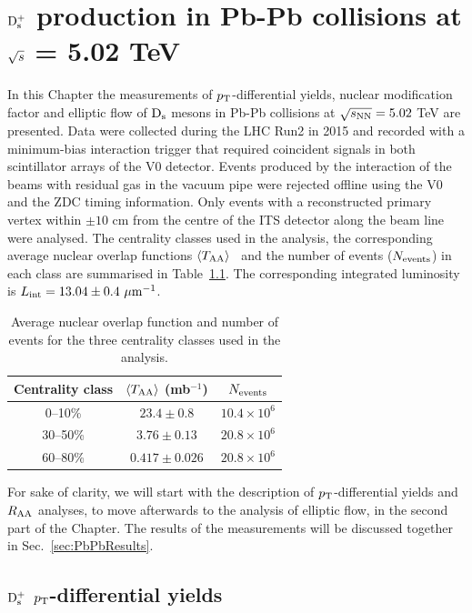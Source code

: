 \chapter{${\rm D_s^+}$ production in Pb-Pb collisions at $\sqrt{s}$ = 5.02 TeV}
\label{chap:PbPb}
In this Chapter the measurements of $p_{\rm T}$-differential yields,
nuclear modification factor and elliptic flow of ${\rm D_s}$ mesons
in Pb-Pb collisions at $\sqrt{s_{\rm NN}} = 5.02$ TeV are presented. Data were
collected during the LHC Run2 in 2015 and recorded with a 
minimum-bias interaction trigger that required coincident signals in 
both scintillator arrays of the V0 detector. Events produced by 
the interaction of the beams with residual gas in the
vacuum pipe were rejected offline using the V0 and the ZDC 
timing information. Only events with a reconstructed primary vertex 
within $\pm 10$ cm from the centre of the ITS detector along
the beam line were analysed. The centrality classes 
used in the analysis, the corresponding 
average nuclear overlap functions $\left\langle T_{\rm AA} \right\rangle$~\cite{ALICE-PUBLIC-2015-008} 
and the number of events ($N_{\rm events}$) in each class 
are summarised in Table~\ref{tab:Nevents}. The corresponding 
integrated luminosity is $L_{\rm int}=13.04\pm0.4~\mathrm{\mu m}^{-1}$.\\
\begin{table}[!h]
	\centering
	\begin{tabular}{ccc}
	\hline
	Centrality class & $\langle T_{\rm AA}\rangle$ (mb$^{-1}$)& $N_{\rm events}$\\
	\hline
	\phantom{0}0--10\% & $23.4\pm0.8$ & $10.4 \times 10^6$ \\
	30--50\% & $3.76\pm0.13$ & $20.8 \times 10^6$\\
	60--80\% & $0.417 \pm 0.026$ & $20.8 \times 10^6$\\
	\hline
	\end{tabular}		
	\caption{Average nuclear overlap function and number of events  for the three centrality classes used in the analysis.}
	\label{tab:Nevents}
\end{table}

For sake of clarity, we will start with the description of $p_{\rm T}$-differential yields and $R_{\rm AA}$ 
analyses, to move afterwards to the analysis of elliptic flow, in the second part of the Chapter. 
The results of the measurements will be discussed together in Sec.~\ref{sec:PbPbResults}.

\section{${\rm D_s^+}$ $p_{\rm T}$-differential yields}
\label{sec:YieldsAndRaa}
